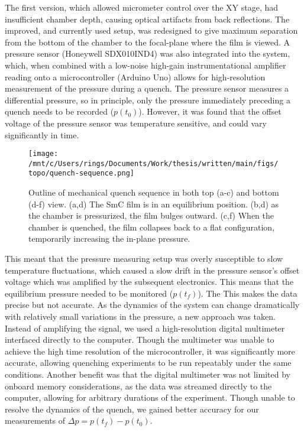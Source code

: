 \documentclass[superscriptaddress,floatfix,draft,prl]{revtex4-1}
\begin{document}
The first version, which allowed micrometer control
over the XY stage, had insufficient chamber depth, causing optical
artifacts from back reflections. The improved, and currently used setup,
was redesigned to give maximum separation from the bottom of the chamber to the focal-plane where the film is
viewed. A pressure sensor (Honeywell SDX010IND4) was also
integrated into the system, which, when combined with a low-noise high-gain
instrumentational amplifier reading onto a microcontroller
(Arduino Uno) allows for high-resolution measurement of the
pressure during a quench. The pressure sensor measures a differential pressure,
so in principle, only the pressure immediately preceding a quench needs to be
recorded ($p(t_0)$). However, it was found that the offset voltage of the
pressure sensor was temperature sensitive, and could vary significantly in time.
\begin{figure}[h!]
    \centering
    \texttt{[image: /mnt/c/Users/rings/Documents/Work/thesis/written/main/figs/topo/quench-sequence.png]}
    \caption[Outline of mechanical quench
    sequence.]{\label{fig:topo:quenchSequence}Outline of mechanical quench
        sequence in both top (a-c) and bottom (d-f) view. (a,d) The SmC film is
        in an equilibrium position. (b,d) as the chamber is
    pressurized, the film bulges outward. (c,f) When the chamber is quenched,
the film collapses back to a flat configuration, temporarily increasing the
in-plane pressure.}
\end{figure}

This meant that the pressure measuring setup was overly susceptible to slow temperature
fluctuations, which caused a slow drift in the pressure sensor's offset voltage
which was amplified by the subsequent electronics.
This means that the equilibrium pressure needed to be monitored ($p(t_f)$). The
This makes the data precise but
not accurate. As the dynamics of the system can change dramatically with
relatively small variations in the pressure, a new approach was taken. Instead
of amplifying the signal, we used a high-resolution digital multimeter
interfaced directly to the computer. Though the multimeter was
unable to achieve the high time resolution of the microcontroller, it was
significantly more accurate, allowing quenching experiments to be run repeatably
under the same conditions. Another benefit was that the digital multimeter was
not limited by onboard memory considerations, as the data was streamed directly
to the computer, allowing for arbitrary durations of the experiment. Though unable to
resolve the dynamics of the quench, we gained better accuracy for our measurements
of $\Delta p=p(t_f)-p(t_0)$.
\end{document}

